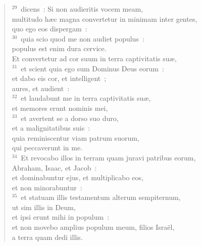 \begin{flushleft}
\begin{verse}
${}^{29}$~dicens~: Si non audieritis vocem meam,\\ multitudo h\ae c magna convertetur in minimam inter gentes,\\ quo ego eos dispergam~:\\
${}^{30}$~quia scio quod me non audiet populus~:\\ populus est enim dura cervice.\\ Et convertetur ad cor suum in terra captivitatis su\ae ,\\
${}^{31}$~et scient quia ego sum Dominus Deus eorum~:\\ et dabo eis cor, et intelligent~;\\ aures, et audient~:\\
${}^{32}$~et laudabunt me in terra captivitatis su\ae ,\\ et memores erunt nominis mei,\\
${}^{33}$~et avertent se a dorso suo duro,\\ et a malignitatibus suis~:\\ quia reminiscentur viam patrum suorum,\\ qui peccaverunt in me.\\
${}^{34}$~Et revocabo illos in terram quam juravi patribus eorum,\\ Abraham, Isaac, et Jacob~:\\ et dominabuntur ejus, et multiplicabo eos,\\ et non minorabuntur~:\\
${}^{35}$~et statuam illis testamentum alterum sempiternum,\\ ut sim illis in Deum,\\ et ipsi erunt mihi in populum~:\\ et non movebo amplius populum meum, filios Isra\"el,\\ a terra quam dedi illis.\end{verse}\end{flushleft}


